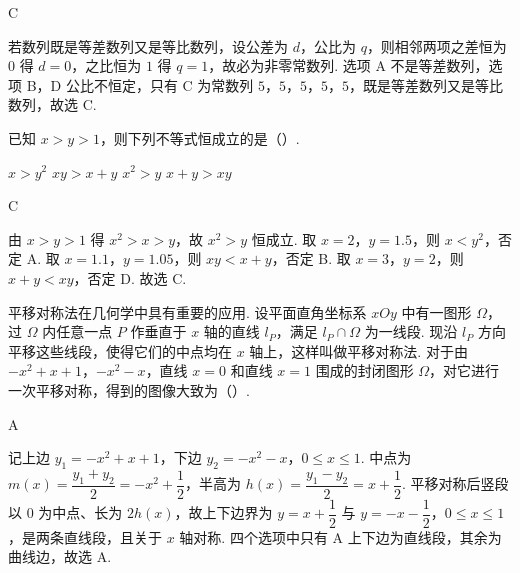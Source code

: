 \documentclass[UTF8,a4paper,oneside,11pt]{ctexbook}
\begin{document}
\begin{answer}
C
\end{answer}

\begin{solution}
若数列既是等差数列又是等比数列，设公差为 \(d\)，公比为 \(q\)，则相邻两项之差恒为 \(0\) 得 \(d=0\)，之比恒为 \(1\) 得 \(q=1\)，故必为非零常数列. 选项 A 不是等差数列，选项 B，D 公比不恒定，只有 C 为常数列 \(5\)，\(5\)，\(5\)，\(5\)，\(5\)，既是等差数列又是等比数列，故选 C.
\end{solution}

\begin{problem}
已知 \(x>y>1\)，则下列不等式恒成立的是（\quad）.

\choices
    {\(x>y^2\)}
    {\(xy>x+y\)}
    {\(x^2>y\)}
    {\(x+y>xy\)}
\end{problem}

\begin{answer}
C
\end{answer}

\begin{solution}
由 \(x>y>1\) 得 \(x^2>x>y\)，故 \(x^2>y\) 恒成立. 取 \(x=2\)，\(y=1.5\)，则 \(x<y^2\)，否定 A. 取 \(x=1.1\)，\(y=1.05\)，则 \(xy<x+y\)，否定 B. 取 \(x=3\)，\(y=2\)，则 \(x+y<xy\)，否定 D. 故选 C.
\end{solution}

\begin{problem}
平移对称法在几何学中具有重要的应用. 设平面直角坐标系 \(xOy\) 中有一图形 \(\Omega\)，过 \(\Omega\) 内任意一点 \(P\) 作垂直于 \(x\) 轴的直线 \(l_P\)，满足 \(l_P\cap\Omega\) 为一线段. 现沿 \(l_P\) 方向平移这些线段，使得它们的中点均在 \(x\) 轴上，这样叫做平移对称法. 对于由 \(-x^2+x+1\)，\(-x^2-x\)，直线 \(x=0\) 和直线 \(x=1\) 围成的封闭图形 \(\Omega\)，对它进行一次平移对称，得到的图像大致为（\quad）.

\choices
    {}
    {}
    {}
    {}
\end{problem}

\begin{answer}
A
\end{answer}

\begin{solution}
记上边 \(y_1=-x^2+x+1\)，下边 \(y_2=-x^2-x\)，\(0\le x\le1\). 中点为 \(m(x)=\dfrac{y_1+y_2}{2}=-x^2+\dfrac12\)，半高为 \(h(x)=\dfrac{y_1-y_2}{2}=x+\dfrac12\). 平移对称后竖段以 \(0\) 为中点、长为 \(2h(x)\)，故上下边界为 \(y=x+\dfrac12\) 与 \(y=-x-\dfrac12\)，\(0\le x\le1\)，是两条直线段，且关于 \(x\) 轴对称. 四个选项中只有 A 上下边为直线段，其余为曲线边，故选 A.
\end{solution}
\end{document}
